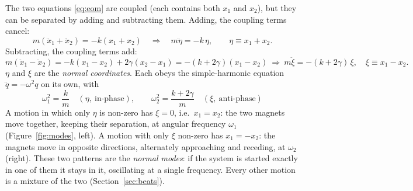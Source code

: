 \documentclass[11pt,a4paper]{article}
\begin{document}
The two equations \eqref{eq:eom} are coupled (each contains both $x_1$ and $x_2$), but they can be separated by adding and subtracting them. Adding, the coupling terms cancel:
\begin{equation}
m(\ddot x_1+\ddot x_2)=-k(x_1+x_2)\quad\Longrightarrow\quad m\ddot\eta=-k\,\eta,\qquad \eta\equiv x_1+x_2 .
\end{equation}
Subtracting, the coupling terms add:
\begin{equation}
m(\ddot x_1-\ddot x_2)=-k(x_1-x_2)+2\gamma(x_2-x_1)=-(k+2\gamma)(x_1-x_2)
\ \Longrightarrow\ m\ddot\xi=-(k+2\gamma)\,\xi,\quad \xi\equiv x_1-x_2 .
\end{equation}
$\eta$ and $\xi$ are the \emph{normal coordinates}. Each obeys the simple-harmonic equation $\ddot q=-\omega^2q$ on its own, with
\begin{equation}
\boxed{\;\omega_1^2=\frac{k}{m}\quad(\eta,\ \text{in-phase}),\qquad \omega_2^2=\frac{k+2\gamma}{m}\quad(\xi,\ \text{anti-phase})\;}
\label{eq:modes}
\end{equation}
A motion in which only $\eta$ is non-zero has $\xi=0$, i.e.\ $x_1=x_2$: the two magnets move together, keeping their separation, at angular frequency $\omega_1$ (Figure~\ref{fig:modes}, left). A motion with only $\xi$ non-zero has $x_1=-x_2$: the magnets move in opposite directions, alternately approaching and receding, at $\omega_2$ (right). These two patterns are the \emph{normal modes}: if the system is started exactly in one of them it stays in it, oscillating at a single frequency. Every other motion is a mixture of the two (Section~\ref{sec:beats}).
\end{document}
